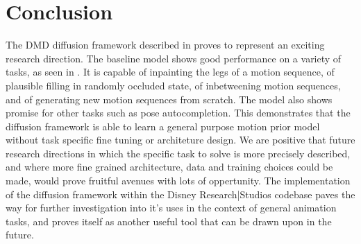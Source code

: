 \section{Conclusion}

The DMD diffusion framework described in  proves to represent an exciting research direction. The baseline model shows good performance on a variety of tasks, as seen in . It is capable of inpainting the legs of a motion sequence, of plausible filling in randomly occluded state, of inbetweening motion sequences, and of generating new motion sequences from scratch. The model also shows promise for other tasks such as pose autocompletion. This demonstrates that the diffusion framework is able to learn a general purpose motion prior model without task specific fine tuning or architeture design. We are positive that future research directions in which the specific task to solve is more precisely described, and where more fine grained architecture, data and training choices could be made, would prove fruitful avenues with lots of oppertunity. The implementation of the diffusion framework within the Disney Research|Studios codebase paves the way for further investigation into it's uses in the context of general animation tasks, and proves itself as another useful tool that can be drawn upon in the future.